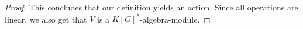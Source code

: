 \begin{proof}
  This concludes that our definition yields an action.
  Since all operations are linear, we also get that $V$ is a $K[G]^\ast$-algebra-module.
\end{proof}


